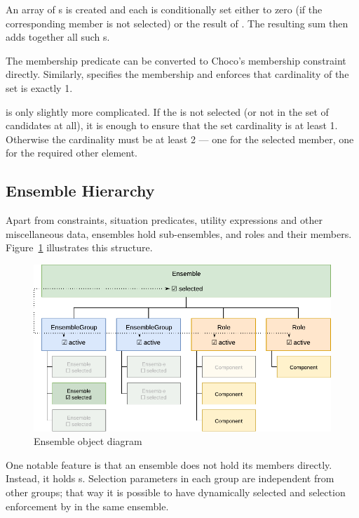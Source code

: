 An array of s is created and each is conditionally set either to zero (if the
corresponding member is not selected) or the result of . The resulting sum then
adds together all such s.

\medskip

The membership predicate  can be converted to Choco's membership
constraint directly. Similarly,  specifies the membership and
enforces that cardinality of the set is exactly 1.

 is only slightly more complicated. If the  is
not selected (or not in the set of candidates at all), it is enough to ensure that the
set cardinality is at least 1. Otherwise the cardinality must be at least 2 --- one for
the selected member, one for the required other element.


\subsection{Ensemble Hierarchy}
\label{impl:choco:hierarchy}

Apart from constraints, situation predicates, utility expressions and other
miscellaneous data, ensembles hold sub-ensembles, and roles and their members.
Figure~\ref{fig:objectdiagram} illustrates this structure.

\begin{figure}[ht]
    \centering
    \includegraphics{img/classdia.pdf}
    \caption{Ensemble object diagram}
    \label{fig:objectdiagram}
\end{figure}

One notable feature is that an ensemble does not hold its members directly. Instead, it
holds s. Selection parameters in each group are independent from other
groups; that way it is possible to have dynamically selected  and
selection enforcement by  in the same ensemble.

